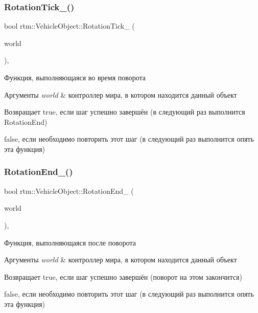 \subsubsection{\texorpdfstring{Rotation\+Tick\+\_\+()}{RotationTick\_()}}
{\footnotesize\ttfamily bool rtm\+::\+Vehicle\+Object\+::\+Rotation\+Tick\+\_\+ (\begin{DoxyParamCaption}\item[{\hyperlink{classrtm_1_1_world_controller}{World\+Controller} $\ast$const}]{world }\end{DoxyParamCaption})\hspace{0.3cm}{\ttfamily [protected]}, {\ttfamily [virtual]}}

Функция, выполняющаяся во время поворота 
\begin{DoxyParams}{Аргументы}
{\em world} & контроллер мира, в котором находится данный объект \\
\hline
\end{DoxyParams}
\begin{DoxyReturn}{Возвращает}
true, если шаг успешно завершён (в следующий раз выполнится Rotation\+End) 

false, если необходимо повторить этот шаг (в следующий раз выполнится опять эта функция) 
\end{DoxyReturn}
\mbox{\label{classrtm_1_1_vehicle_object_ab109b98ab7bda9402a6197efa98e5a03}} 
\subsubsection{\texorpdfstring{Rotation\+End\+\_\+()}{RotationEnd\_()}}
{\footnotesize\ttfamily bool rtm\+::\+Vehicle\+Object\+::\+Rotation\+End\+\_\+ (\begin{DoxyParamCaption}\item[{\hyperlink{classrtm_1_1_world_controller}{World\+Controller} $\ast$const}]{world }\end{DoxyParamCaption})\hspace{0.3cm}{\ttfamily [protected]}, {\ttfamily [virtual]}}

Функция, выполняющаяся после поворота 
\begin{DoxyParams}{Аргументы}
{\em world} & контроллер мира, в котором находится данный объект \\
\hline
\end{DoxyParams}
\begin{DoxyReturn}{Возвращает}
true, если шаг успешно завершён (поворот на этом закончится) 

false, если необходимо повторить этот шаг (в следующий раз выполнится опять эта функция) 
\end{DoxyReturn}
\mbox{\label{classrtm_1_1_vehicle_object_a8976be533dfa4704f7b221c79d1fce99}} 
